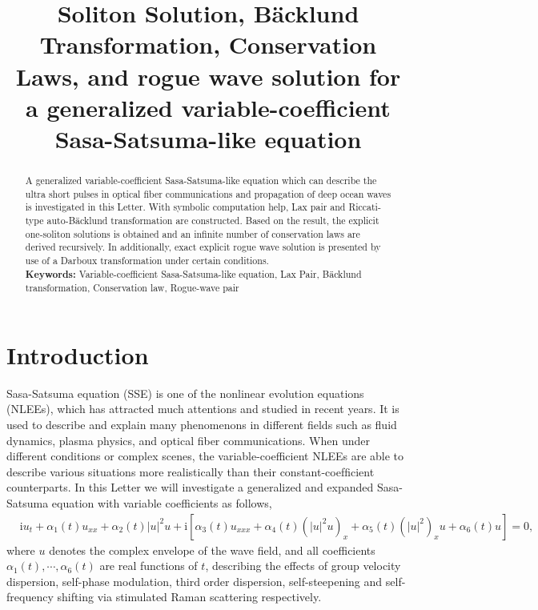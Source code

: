 \documentclass[12pt]{article}
\title{\large\bfseries Soliton Solution, B\"acklund Transformation, Conservation Laws, and rogue wave solution for a generalized variable-coefficient Sasa-Satsuma-like equation}
\author{}
\begin{document}
\maketitle

\begin{abstract}
A generalized variable-coefficient Sasa-Satsuma-like equation which can describe the ultra short pulses in optical fiber communications and propagation of deep ocean waves is investigated in this Letter. With symbolic computation help, Lax pair and Riccati-type auto-B\"acklund transformation are constructed. Based on the result, the explicit one-soliton solutions is obtained and an infinite number of conservation laws are derived recursively. In additionally, exact explicit rogue wave solution is presented by use of a Darboux transformation under certain conditions. \\
\indent\textbf{Keywords:} Variable-coefficient Sasa-Satsuma-like equation, Lax Pair, B\"acklund transformation, Conservation law, Rogue-wave pair
\end{abstract}

\section{Introduction}
Sasa-Satsuma equation (SSE) is one of the nonlinear evolution equations (NLEEs), which has attracted much attentions and studied in recent years. It is used to describe and explain many phenomenons in different fields such as fluid dynamics, plasma physics, and optical fiber communications.\cite{1,2,3,4,5,6,7,8,9} When under different conditions or complex scenes, the variable-coefficient NLEEs are able to describe various situations more realistically than their constant-coefﬁcient counterparts.\cite{8,9} In this Letter we will investigate a generalized and expanded Sasa-Satsuma equation with variable coefficients as follows,
\begin{align}
  & \mathrm{i}u_{t} + \alpha_{1}(t)u_{xx} + \alpha_2(t)|u|^{2}u + \mathrm{i}\left[\alpha_3(t)u_{xxx} + \alpha_{4}(t)(|u|^{2}u)_{x} + \alpha_{5}(t)(|u|^{2})_{x}u + \alpha_{6}(t)u \right] = 0,   \label{1}
\end{align}
where $u$ denotes the complex envelope of the wave field, and all coefficients $\alpha_{1}(t), \cdots, \alpha_{6}(t)$ are real functions of $t$, describing the effects of group velocity dispersion, self-phase modulation, third order dispersion, self-steepening and self-frequency shifting via stimulated Raman scattering respectively.
\end{document}
